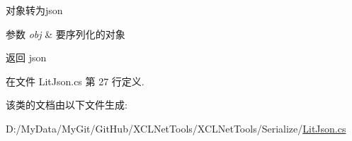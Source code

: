 对象转为json 


\begin{DoxyParams}{参数}
{\em obj} & 要序列化的对象\\
\hline
\end{DoxyParams}
\begin{DoxyReturn}{返回}
json
\end{DoxyReturn}


在文件 Lit\-Json.\-cs 第 27 行定义.



该类的文档由以下文件生成\-:\begin{DoxyCompactItemize}
\item 
D\-:/\-My\-Data/\-My\-Git/\-Git\-Hub/\-X\-C\-L\-Net\-Tools/\-X\-C\-L\-Net\-Tools/\-Serialize/\hyperlink{_lit_json_8cs}{Lit\-Json.\-cs}\end{DoxyCompactItemize}
